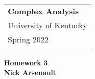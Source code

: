 \documentclass[a4paper,12pt]{article} %
\theoremstyle{plain}
\theoremstyle{definition}
\begin{document}
\thispagestyle{empty} %
\begin{tabular}{p{15.5cm}} %
{\large \bf Complex Analysis} \\
University of Kentucky \\ Spring 2022 \\
\hline %
\\
\end{tabular} %

\vspace*{0.3cm} %

\begin{center} %
  {\Large \bf Homework 3} %
	\vspace{2mm} \\
  \textbf{Nick Arsenault}
\end{center}  
\vspace{0.4cm}
\end{document}

